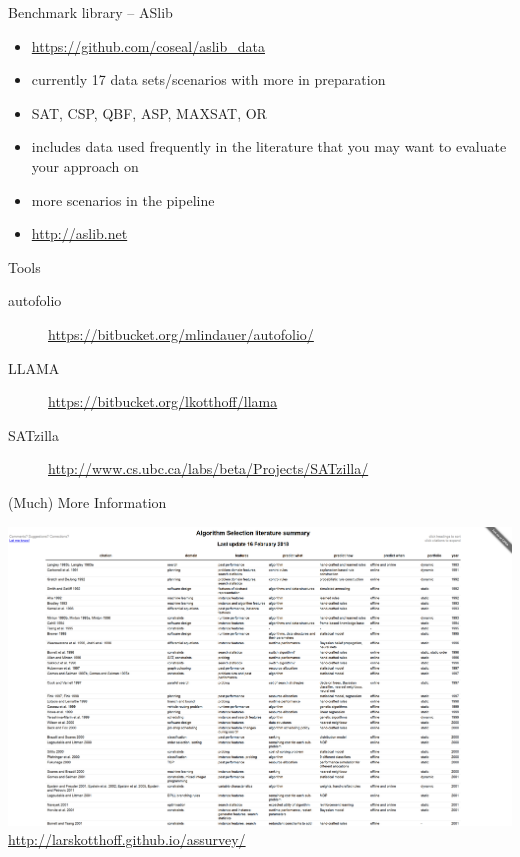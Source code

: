 \begin{frame}{Benchmark library -- ASlib}
\begin{itemize}
\item \url{https://github.com/coseal/aslib_data}
\item currently 17 data sets/scenarios with more in preparation
\item SAT, CSP, QBF, ASP, MAXSAT, OR
\item includes data used frequently in the literature that you may want to
    evaluate your approach on
\item more scenarios in the pipeline
\item \url{http://aslib.net}\\[1em]
\end{itemize}
\end{frame}

\begin{frame}{Tools}
\begin{description}
\item[autofolio] \url{https://bitbucket.org/mlindauer/autofolio/}
\item[LLAMA] \url{https://bitbucket.org/lkotthoff/llama}
\item[SATzilla]
 \footnotesize{\url{http://www.cs.ubc.ca/labs/beta/Projects/SATzilla/}}
\end{description}
\end{frame}

\begin{frame}{(Much) More Information}
\begin{center}
\includegraphics[height=.6\textheight]{survey}\\
\url{http://larskotthoff.github.io/assurvey/}
\end{center}
\end{frame}


